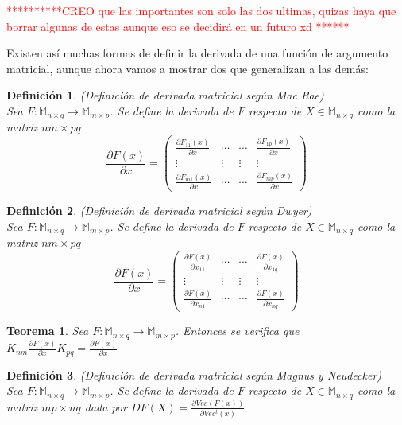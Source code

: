 \documentclass{article}
\theoremstyle{theorem-style}  %
\newtheorem{theorem}{Teorema}[section]  %
\theoremstyle{definition-style}
\newtheorem{definition}{Definición}[section]
\theoremstyle{example-style}
\theoremstyle{exercise-style}
\begin{document}
\textcolor{red}{**********CREO que las importantes son solo las dos ultimas, quizas haya que borrar algunas de estas aunque eso se decidirá en un futuro xd ******}

Existen así muchas formas de definir la derivada de una función de argumento matricial, aunque ahora vamos a mostrar dos que generalizan a las demás:

\begin{definition}
	(Definición de derivada matricial según Mac Rae)\\
	Sea $F:\mathbb{M}_{n\times q}\rightarrow \mathbb{M}_{m\times p}$. Se define la derivada de $F$ respecto de $X\in \mathbb{M}_{n\times q}$ como la matriz $nm\times pq$
	$$ \frac{\partial F(x)}{\partial x} = \left( \begin{array}{cccc}
	\frac{\partial F_{11}(x)}{\partial x} & \cdots & \cdots & \frac{\partial F_{1p}(x)}{\partial x}\\
	\vdots & \vdots & \vdots & \vdots \\
	\frac{\partial F_{m1}(x)}{\partial x} & \cdots & \cdots & \frac{\partial F_{mp}(x)}{\partial x}
	\end{array}\right)$$	
\end{definition}

\begin{definition}
	(Definición de derivada matricial según Dwyer)\\
	Sea $F:\mathbb{M}_{n\times q}\rightarrow \mathbb{M}_{m\times p}$. Se define la derivada de $F$ respecto de $X\in \mathbb{M}_{n\times q}$ como la matriz $nm\times pq$
	$$ \frac{\partial F(x)}{\partial x} = \left( \begin{array}{cccc}
	\frac{\partial F(x)}{\partial x_{11}} & \cdots & \cdots & \frac{\partial F(x)}{\partial x_{1q}}\\
	\vdots & \vdots & \vdots & \vdots \\
	\frac{\partial F(x)}{\partial x_{n1}} & \cdots & \cdots & \frac{\partial F(x)}{\partial x_{nq}}
	\end{array}\right)$$	
\end{definition}

\begin{theorem}
		\textit{Sea $F:\mathbb{M}_{n\times q}\rightarrow \mathbb{M}_{m\times p}$. Entonces se verifica que $K_{nm}\frac{\partial F(x)}{\partial x}K_{pq}= \frac{\partial F(x)}{\partial x}$}
\end{theorem}

\begin{definition}
	(Definición de derivada matricial según Magnus y Neudecker)\\
	Sea $F:\mathbb{M}_{n\times q}\rightarrow \mathbb{M}_{m\times p}$. Se define la derivada de $F$ respecto de $X\in \mathbb{M}_{n\times q}$ como la matriz $mp\times nq$ dada por \textbf{$DF(X)=\frac{\partial Vec(F(x))}{\partial Vec^t(x)}$}
\end{definition}
\end{document}
